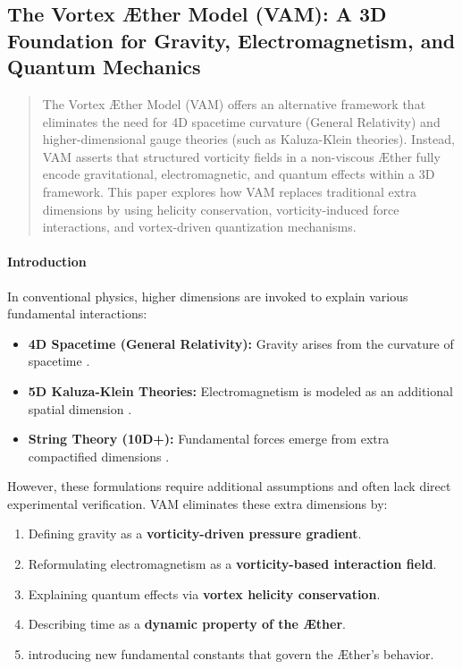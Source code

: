 


\subsection{The Vortex Æther Model (VAM): A 3D Foundation for Gravity, Electromagnetism, and Quantum Mechanics}\label{subsec:the-vortex-ther-model-(vam):-a-3d-foundation-for-gravity-electromagnetism-and-quantum-mechanics}


\begin{abstract}
        The Vortex Æther Model (VAM) offers an alternative framework that eliminates the need for 4D spacetime curvature (General Relativity) and higher-dimensional gauge theories (such as Kaluza-Klein theories). Instead, VAM asserts that structured vorticity fields in a non-viscous Æther fully encode gravitational, electromagnetic, and quantum effects within a 3D framework. This paper explores how VAM replaces traditional extra dimensions by using helicity conservation, vorticity-induced force interactions, and vortex-driven quantization mechanisms.
    \end{abstract}

    \paragraph*{Introduction}
    In conventional physics, higher dimensions are invoked to explain various fundamental interactions:
    \begin{itemize}
        \item \textbf{4D Spacetime (General Relativity):} Gravity arises from the curvature of spacetime \cite{Einstein1915}.
        \item \textbf{5D Kaluza-Klein Theories:} Electromagnetism is modeled as an additional spatial dimension \cite{Kaluza1921,Klein1926}.
        \item \textbf{String Theory (10D+):} Fundamental forces emerge from extra compactified dimensions \cite{Polchinski1998}.
    \end{itemize}
    However, these formulations require additional assumptions and often lack direct experimental verification. VAM eliminates these extra dimensions by:
    \begin{enumerate}
        \item Defining gravity as a \textbf{vorticity-driven pressure gradient}.
        \item Reformulating electromagnetism as a \textbf{vorticity-based interaction field}.
        \item Explaining quantum effects via \textbf{vortex helicity conservation}.
        \item Describing time as a \textbf{dynamic property of the Æther}.
        \item introducing new fundamental constants that govern the Æther's behavior.
    \end{enumerate}


